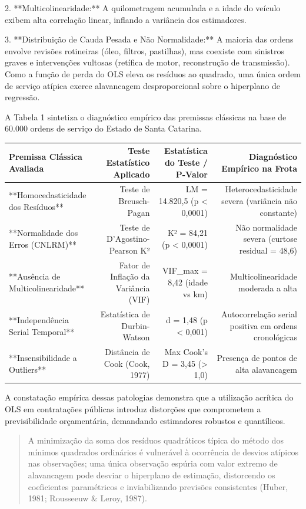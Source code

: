 \documentclass[12pt,a4paper]{article}
\begin{document}
2. **Multicolinearidade:** A quilometragem acumulada e a idade do veículo exibem alta correlação linear, inflando a variância dos estimadores.

3. **Distribuição de Cauda Pesada e Não Normalidade:** A maioria das ordens envolve revisões rotineiras (óleo, filtros, pastilhas), mas coexiste com sinistros graves e intervenções vultosas (retífica de motor, reconstrução de transmissão). Como a função de perda do OLS eleva os resíduos ao quadrado, uma única ordem de serviço atípica exerce alavancagem desproporcional sobre o hiperplano de regressão.

A Tabela 1 sintetiza o diagnóstico empírico das premissas clássicas na base de 60.000 ordens de serviço do Estado de Santa Catarina.

\begin{table}[htbp]
\centering
\small
\begin{tabular}{lrrr}
\toprule
\textbf{Premissa Clássica Avaliada} & \textbf{Teste Estatístico Aplicado} & \textbf{Estatística do Teste / P-Valor} & \textbf{Diagnóstico Empírico na Frota} \\
\midrule
**Homocedasticidade dos Resíduos** & Teste de Breusch-Pagan & LM = 14.820,5 (p < 0,0001) & Heterocedasticidade severa (variância não constante) \\
**Normalidade dos Erros (CNLRM)** & Teste de D'Agostino-Pearson K² & K² = 84,21 (p < 0,0001) & Não normalidade severa (curtose residual = 48,6) \\
**Ausência de Multicolinearidade** & Fator de Inflação da Variância (VIF) & VIF\_max = 8,42 (idade vs km) & Multicolinearidade moderada a alta \\
**Independência Serial Temporal** & Estatística de Durbin-Watson & d = 1,48 (p < 0,001) & Autocorrelação serial positiva em ordens cronológicas \\
**Insensibilidade a Outliers** & Distância de Cook (Cook, 1977) & Max Cook's D = 3,45 (> 1,0) & Presença de pontos de alta alavancagem \\
\bottomrule
\end{tabular}
\end{table}

A constatação empírica dessas patologias demonstra que a utilização acrítica do OLS em contratações públicas introduz distorções que comprometem a previsibilidade orçamentária, demandando estimadores robustos e quantílicos.

\begin{quote}
\small A minimização da soma dos resíduos quadráticos típica do método dos mínimos quadrados ordinários é vulnerável à ocorrência de desvios atípicos nas observações; uma única observação espúria com valor extremo de alavancagem pode desviar o hiperplano de estimação, distorcendo os coeficientes paramétricos e inviabilizando previsões consistentes (Huber, 1981; Rousseeuw \& Leroy, 1987).
\end{quote}
\end{document}
